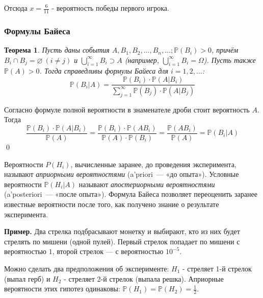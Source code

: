 \documentclass[oneside,final,14pt]{extreport}
\newcommand\myex{{\bf Пример.}}
\newcommand\myprob[1]{{\mathbb{P}(#1)}}
\renewenvironment{proof}{{\bfseries Доказательство.}}{\qed}
\newtheorem{thm}{Теорема}[section]
\theoremstyle{definition}
\begin{document}
Отсюда $x = \frac{6}{11}$ - вероятность победы первого игрока.

\subsubsection{Формулы Байеса}
\begin{thm}
    Пусть даны события $A, B_1, B_2, \ldots, B_n, \ldots; \myprob{B_i} > 0$, причём $B_i \cap B_j = \varnothing ~(i \neq j)$ и $\bigcup\limits_{i=1}^\infty B_i \supset A$ (например, $\bigcup\limits_{i=1}^{\infty}B_i = \Omega$). Пусть также $\myprob{A} > 0$. Тогда справедливы {\it формулы Байеса} для $i = 1, 2, \ldots$:
    \begin{equation*}
        \mathbb{P}\left(B_{i} | A\right)=\frac{\mathbb{P}\left(B_{i}\right) \cdot \mathbb{P}\left(A | B_{i}\right)}{\sum\limits_{j=1}^{\infty} \mathbb{P}\left(B_{j}\right) \cdot \mathbb{P}\left(A | B_{j}\right)}
    \end{equation*}
\end{thm}

\begin{proof}
    Согласно формуле полной вероятности в знаменателе дроби стоит вероятность $A$. Тогда
    \begin{equation*}
        \frac{\mathbb{P}\left(B_{i}\right) \cdot \mathbb{P}\left(A | B_{i}\right)}{\mathbb{P}(A)}=\frac{\mathbb{P}\left(B_{i}\right) \cdot \mathbb{P}\left(A B_{i}\right)}{\mathbb{P}(A) \cdot \mathbb{P}\left(B_{i}\right)}=\frac{\mathbb{P}\left(A B_{i}\right)}{\mathbb{P}(A)}=\mathbb{P}\left(B_{i} | A\right) 
    \end{equation*}
\end{proof}

Вероятности $P(H_i)$, вычисленные заранее, до проведения эксперимента, называют {\it априорными вероятностями} (a’priori~--- «до опыта»). Условные вероятности $\myprob{H_i | A}$ называют {\it апостериорными вероятностями} (a’posteriori~--- «после опыта»). Формула Байеса позволяет переоценить заранее известные вероятности после того, как получено знание о результате эксперимента.

\myex{} Два стрелка подбрасывают монетку и выбирают, кто из
них будет стрелять по мишени (одной пулей). Первый стрелок попадает по
мишени с вероятностью $1$, второй стрелок — с вероятностью $10^{-5}$.

Можно сделать два предположения об эксперименте: $H_1$ - стреляет 1-й
стрелок (выпал герб) и $H_2$ - стреляет 2-й стрелок (выпала решка). Априорные вероятности этих гипотез одинаковы: $\mathbb{P}\left(H_{1}\right)=\mathbb{P}\left(H_{2}\right)=\frac{1}{2}.$
\end{document}

